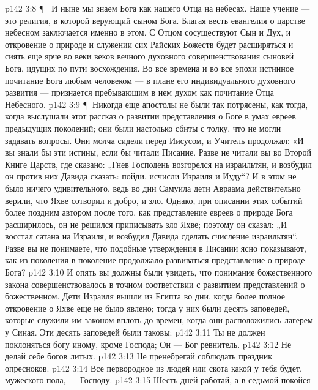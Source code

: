 \vs p142 3:8 \P\ \bibnobreakspace {} И ныне мы знаем Бога как нашего Отца на небесах. Наше учение --- это религия, в которой верующий  сыном Бога. Благая весть евангелия о царстве небесном заключается именно в этом. С Отцом сосуществуют Сын и Дух, и откровение о природе и служении сих Райских Божеств будет расширяться и сиять еще ярче во веки веков вечного духовного совершенствования сыновей Бога, идущих по пути восхождения. Во все времена и во все эпохи истинное почитание Бога любым человеком --- в плане его индивидуального духовного развития --- признается пребывающим в нем духом как почитание Отца Небесного.
\vs p142 3:9 \P\ Никогда еще апостолы не были так потрясены, как тогда, когда выслушали этот рассказ о развитии представления о Боге в умах евреев предыдущих поколений; они были настолько сбиты с толку, что не могли задавать вопросы. Они молча сидели перед Иисусом, и Учитель продолжал: «И вы знали бы эти истины, если бы читали Писание. Разве не читали вы во Второй Книге Царств, где сказано: „Гнев Господень возгорелся на израильтян, и возбудил он против них Давида сказать: пойди, исчисли Израиля и Иуду“? И в этом не было ничего удивительного, ведь во дни Самуила дети Авраама действительно верили, что Яхве сотворил и добро, и зло. Однако, при описании этих событий более поздним автором после того, как представление евреев о природе Бога расширилось, он не решился приписывать зло Яхве; поэтому он сказал: „И восстал сатана на Израиля, и возбудил Давида сделать счисление израильтян“. Разве вы не понимаете, что подобные утверждения в Писании ясно показывают, как из поколения в поколение продолжало развиваться представление о природе Бога?
\vs p142 3:10 И опять вы должны были увидеть, что понимание божественного закона совершенствовалось в точном соответствии с развитием представлений о божественном. Дети Израиля вышли из Египта во дни, когда более полное откровение о Яхве еще не было явлено; тогда у них были десять заповедей, которые служили им законом вплоть до времен, когда они расположились лагерем у Синая. Эти десять заповедей были таковы:
\vs p142 3:11 \bibnobreakspace Ты не должен поклоняться богу иному, кроме Господа; Он --- Бог ревнитель.
\vs p142 3:12 \bibnobreakspace Не делай себе богов литых.
\vs p142 3:13 \bibnobreakspace Не пренебрегай соблюдать праздник опресноков.
\vs p142 3:14 \bibnobreakspace Все первородное из людей или скота какой у тебя будет, мужеского пола, --- Господу.
\vs p142 3:15 \bibnobreakspace Шесть дней работай, а в седьмой покойся
